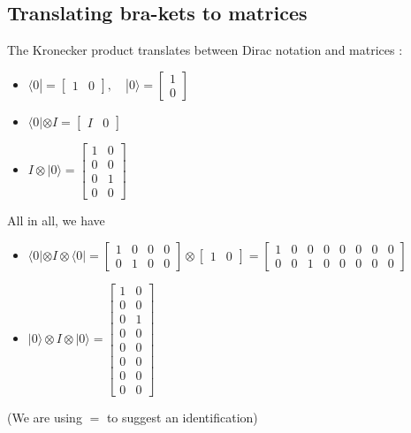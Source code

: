 \documentclass[11pt]{article}
\begin{document}
\subsection*{Translating bra-kets to matrices}
The Kronecker product translates between Dirac notation and matrices : 
\begin{itemize}
    \item $\langle 0| = \begin{bmatrix} 1 & 0 \end{bmatrix}, \quad |0\rangle = \begin{bmatrix} 1 \\ 0 \end{bmatrix}$
   
    \item $\langle 0| \otimes I = \begin{bmatrix} I & 0 \end{bmatrix}$
    
      \item $I \otimes |0\rangle = \begin{bmatrix} 1 & 0 \\ 0 & 0 \\ 0 & 1 \\ 0 & 0 \end{bmatrix}$
\end{itemize}
All in all, we have
\begin{itemize}
    \item $\langle 0| \otimes I \otimes \langle 0| = \begin{bmatrix} 1 & 0 & 0 & 0 \\ 0 & 1 & 0 & 0 \end{bmatrix} \otimes 
     \begin{bmatrix} 1 & 0 \end{bmatrix} = 
    \left[ \begin{array}{cccc|cccc}
    1 & 0 & 0 & 0 & 0 & 0 & 0 & 0 \\
    0 & 0 & 1 & 0 & 0 & 0 & 0 & 0 
    \end{array} \right]$
    \item $|0\rangle \otimes I \otimes |0\rangle = 
    \begin{bmatrix} 
    1 & 0 \\ 0 & 0 \\ 0 & 1 \\ 0 & 0 \\ 0 & 0 \\ 0 & 0 \\ 0 & 0 \\ 0 & 0 
    \end{bmatrix}$
\end{itemize}
(We are using $=$ to suggest an identification)
\end{document}
